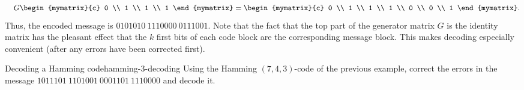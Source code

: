 \begin{solution}
\begin{equation*}
    \quad
    G \begin{mymatrix}{c} 0 \\ 1 \\ 1 \\ 1 \end{mymatrix}
    = \begin{mymatrix}{c} 0 \\ 1 \\ 1 \\ 1 \\ 0 \\ 0 \\ 1 \end{mymatrix}.
  \end{equation*}
  Thus, the encoded message is $0101010~1110000~0111001$. Note that
  the fact that the top part of the generator matrix $G$ is the
  identity matrix has the pleasant effect that the $k$ first bits of
  each code block are the corresponding message block. This makes
  decoding especially convenient (after any errors have been corrected
  first).
\end{solution}  

\begin{example}{Decoding a Hamming code}{hamming-3-decoding}
  Using the Hamming $(7,4,3)$-code of the previous example, correct
  the errors in the message $1011101~1101001~0001101~1110000$ and
  decode it.
\end{example}

